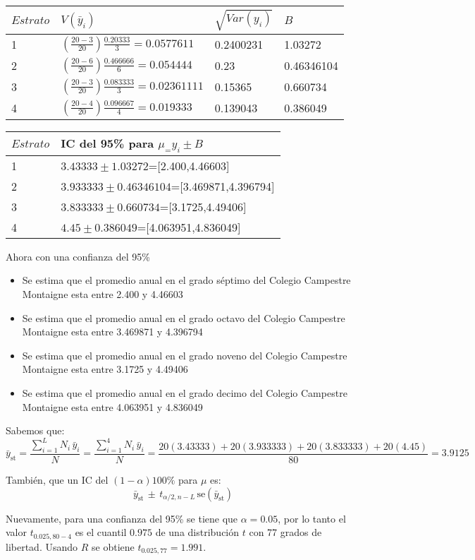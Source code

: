 \documentclass[
]{article}
\providecommand{\tightlist}{%
  \setlength{\itemsep}{0pt}\setlength{\parskip}{0pt}}
\begin{document}
\begin{longtable}[]{@{}llll@{}}
\toprule
\(Estrato\) & \(\widehat{V}(\bar{y}_i)\) & \(\sqrt{Var(y_i)}\) &
\(B\)\tabularnewline
\midrule
\endhead
1 & \((\frac{20 - 3}{20})\frac{0.20333}{3}=0.0577611\) & 0.2400231 &
1.03272\tabularnewline
2 & \((\frac{20 - 6}{20})\frac{0.466666}{6}=0.054444\) & 0.23 &
0.46346104\tabularnewline
3 & \((\frac{20 - 3}{20})\frac{0.083333}{3}=0.02361111\) & 0.15365 &
0.660734\tabularnewline
4 & \((\frac{20 - 4}{20})\frac{0.096667}{4}=0.019333\) & 0.139043 &
0.386049\tabularnewline
\bottomrule
\end{longtable}

\begin{longtable}[]{@{}ll@{}}
\toprule
\(Estrato\) & IC del 95\% para \(\mu_=y_i\pm B\)\tabularnewline
\midrule
\endhead
1 & \(3.43333\pm1.03272\)={[}2.400,4.46603{]}\tabularnewline
2 & \(3.933333\pm0.46346104\)={[}3.469871,4.396794{]}\tabularnewline
3 & \(3.833333\pm0.660734\)={[}3.1725,4.49406{]}\tabularnewline
4 & \(4.45\pm0.386049\)={[}4.063951,4.836049{]}\tabularnewline
\bottomrule
\end{longtable}

Ahora con una confianza del 95\%

\begin{itemize}
\tightlist
\item
  Se estima que el promedio anual en el grado séptimo del Colegio
  Campestre Montaigne esta entre 2.400 y 4.46603
\item
  Se estima que el promedio anual en el grado octavo del Colegio
  Campestre Montaigne esta entre 3.469871 y 4.396794
\item
  Se estima que el promedio anual en el grado noveno del Colegio
  Campestre Montaigne esta entre 3.1725 y 4.49406
\item
  Se estima que el promedio anual en el grado decimo del Colegio
  Campestre Montaigne esta entre 4.063951 y 4.836049
\end{itemize}

Sabemos que:
\[\bar{y}_\text{st} = \frac{\sum_{i = 1}^L N_i\,\bar{y}_i}{N} = \frac{\sum_{i = 1}^4 N_i\,\bar{y}_i}{N} = \frac{20(3.43333 ) + 20(3.933333) + 20(3.833333)+ 20(4.45)}{80} = 3.9125\]

También, que un IC del \((1 - \alpha)100\%\) para \(\mu\) es:
\[\bar{y}_\text{st} \,\pm\, t_{\alpha/2, n - L}\, \text{se}(\bar{y}_\text{st})\]

Nuevamente, para una confianza del 95\% se tiene que \(\alpha = 0.05\),
por lo tanto el valor \(t_{0.025, 80 - 4}\) es el cuantil \(0.975\) de
una distribución \(t\) con 77 grados de libertad. Usando \(R\) se
obtiene \(t_{0.025, 77} = 1.991\).
\end{document}
